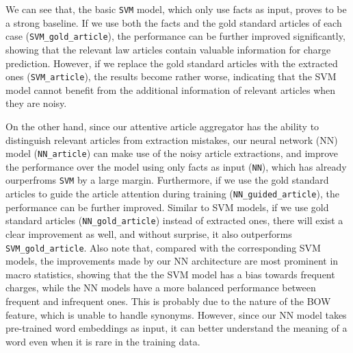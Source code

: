 
We can see that, the basic \texttt{SVM} model, which only use facts as input, proves to be a strong baseline. If we use both the facts and the gold standard articles of each case (\texttt{SVM\_gold\_article}), the performance can be further improved significantly, showing that the relevant law articles contain valuable information for charge prediction. However, if we replace the gold standard articles with the extracted ones (\texttt{SVM\_article}), the results become rather worse, indicating that the SVM model cannot benefit from the additional information of relevant articles when they are noisy. 

On the other hand, since our attentive article aggregator has the ability to distinguish relevant articles from extraction mistakes, our neural network (NN) model (\texttt{NN\_article}) can make use of the noisy article extractions, and improve the performance over the model using only facts as input (\texttt{NN}), which has already ourperfroms \texttt{SVM} by a large margin.
Furthermore, if we use the gold standard articles to guide the article attention during training (\texttt{NN\_guided\_article}), the performance can be further improved.
Similar to SVM models, if we use gold standard articles (\texttt{NN\_gold\_article}) instead of extracted ones, there will exist a clear improvement as well, and without surprise, it also outperforms \texttt{SVM\_gold\_article}.
Also note that, compared with the corresponding SVM models, the improvements made by our NN architecture are most prominent in macro statistics, showing that the the SVM model has a  bias towards frequent charges, while the NN models have a more balanced performance between frequent and infrequent ones. This is probably due to the nature of the BOW feature, which is unable to handle synonyms. However, since our NN model takes pre-trained word embeddings as input, it can better understand the meaning of a word even when it is rare in the training data. 


